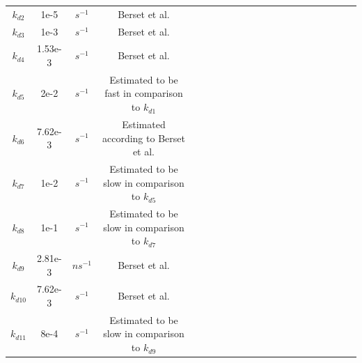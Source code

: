 \begin{table}[htbp]
\begin{tabular}{ccccccccccccccccccccc}
		$k_{d2}$&1e-5&$s^{-1} $ & Berset et al.\\
		$k_{d3}$&1e-3&$s^{-1} $ & Berset et al.\\
		$k_{d4}$&1.53e-3&$s^{-1} $  & Berset et al.\\
		$k_{d5} $& 2e-2&$s^{-1} $& Estimated to be fast in comparison to $k_{d1}$\\
		$k_{d6}$&7.62e-3&$s^{-1} $&  Estimated according to Berset et al.\\
		$k_{d7}$& 1e-2&$s^{-1} $&  Estimated to be slow in comparison to $k_{d5}$ \\
		$k_{d8}$&1e-1&$s^{-1} $&  Estimated to be slow in comparison to $k_{d7}$ \\
		$k_{d9}$&2.81e-3  & $ns^{-1}$ & Berset et al.  \\
		$k_{d10} $ &7.62e-3 &$s^{-1}$ & Berset et al. \\
		$k_{d11}$& 8e-4& $s^{-1}$& Estimated to be slow in comparison to $k_{d9}$ \\
		\bottomrule
	\end{tabular}
\end{table}
